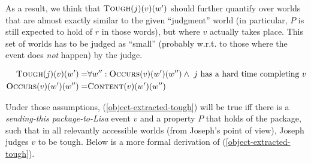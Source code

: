 \documentclass[11pt]{article}
\begin{document}
As a result, we think that $\textsc{Tough}(j)(v)(w')$ should further quantify over worlds that are almost exactly similar to the given ``judgment'' world (in particular, $P$ is still expected to hold of $r$ in those words), but where $v$ actually takes place. This set of worlds has to be judged as ``small'' (probably w.r.t. to those where the event does \textit{not} happen) by the judge.



\begin{align*}
	\textsc{Tough}(j)(v)(w') = &\forall w'' : \textsc{Occurs}(v)(w')(w'') \wedge  \ \text{$j$ has a hard time completing $v$} \\
	\textsc{Occurs}(v)(w')(w'') =& \textsc{Content}(v)(w')(w'')
\end{align*}




Under those assumptions, (\ref{object-extracted-tough}) will be true iff there is a \textit{sending-this package-to-Lisa} event $v$ and a property $P$ that holds of the package, such that in all relevantly accessible worlds (from Joseph's point of view), Joseph judges $v$ to be tough. Below is a more formal derivation of (\ref{object-extracted-tough}).

\iffalse
	\begin{align*}
		\llbracket (\ref{object-extracted-tough})  \rrbracket
		&\stackrel{PM}{=} \exists v_\nu. \ \lambda w_s. \ \llbracket \text{tough} \rrbracket\llbracket \text{J$_j$} \rrbracket\llbracket \text{this package} \rrbracket(v)(w) \wedge \llbracket \text{for PRO$_j$ to send this package to L} \rrbracket(v)(w)\\
		&\stackrel{PM}{=} \exists v_\nu. \ \lambda w_s. \ \llbracket \text{tough} \rrbracket\llbracket \text{J} \rrbracket\llbracket \text{this package} \rrbracket(v)(w) \wedge \text{\textsc{Content}}(v)(w) = \text{J sends this package to L} \rrbracket(v)(w)\\
		&\stackrel{FA}{=} \lambda e. \ \lambda w. \ \llbracket \text{tough} \rrbracket (Suzi)(e)(w) \wedge \llbracket \text{Suzi please Joseph} \rrbracket(e)(w)\\
		&\stackrel{FA}{=} \lambda e. \ \lambda w. \ \text{\textsc{Tough}}(e)(w)(Suzi) \\
	\end{align*}\fi
\end{document}
